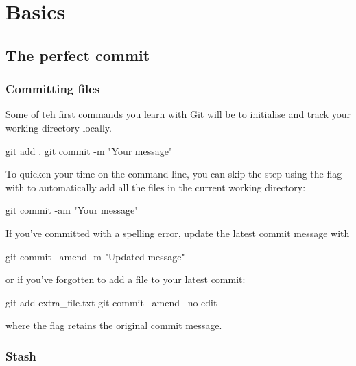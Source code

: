 \chapter{Basics}

\section{The perfect commit}




\subsection{Committing files}

Some of teh first commands you learn with Git will be to initialise and track your working directory locally.

\begin{git-bash}
    git add .
    git commit -m "Your message"
\end{git-bash}

To quicken your time on the command line, you can skip the  step using the  flag with  to automatically add all the files in the current working directory:

\begin{git-bash}
    git commit -am "Your message"
\end{git-bash}

If you've committed with a spelling error, update the latest commit message with

\begin{git-bash}
    git commit --amend -m "Updated message"
\end{git-bash}

\noindent or if you've forgotten to add a file to your latest commit:

\begin{git-bash}
    git add extra_file.txt
    git commit --amend --no-edit
\end{git-bash}

\noindent where the  flag retains the original commit message.



\subsection{Stash}

